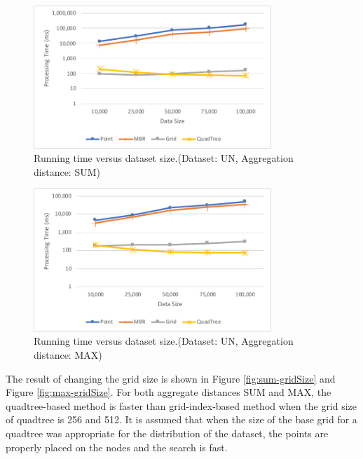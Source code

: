 \documentclass[a4paper,11pt]{report}
\theoremstyle{mytheoremstyle}
\begin{document}
\begin{figure}
    \begin{center}
        \includegraphics[width=0.8\textwidth]{src/images/UN-SUM.pdf}
    \end{center}
    \caption{Running time versus dataset size.(Dataset: UN, Aggregation distance: SUM)}
    \label{fig:sum-dataSize}
\end{figure}

\begin{figure}
    \begin{center}
        \includegraphics[width=0.8\textwidth]{src/images/UN-MAX.pdf}
    \end{center}
    \caption{Running time versus dataset size.(Dataset: UN, Aggregation distance: MAX)}
    \label{fig:max-dataSize}
\end{figure}

The result of changing the grid size is shown in Figure \ref{fig:sum-gridSize} and Figure \ref{fig:max-gridSize}. For both aggregate distances SUM and MAX, the quadtree-based method is faster than grid-index-based method when the grid size of quadtree is 256 and 512. It is assumed that when the size of the base grid for a quadtree was appropriate for the distribution of the dataset, the points are properly placed on the nodes and the search is fast.
\end{document}
